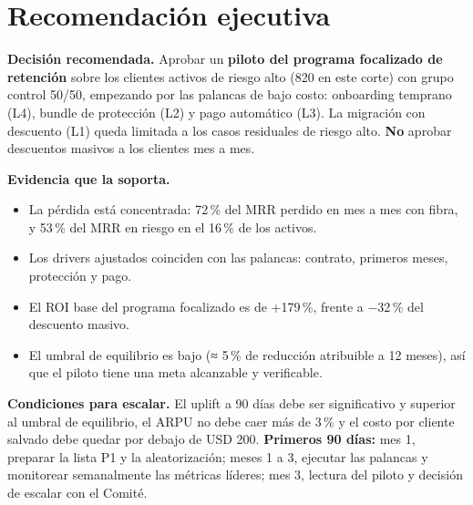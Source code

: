 \documentclass[10.5pt,a4paper]{article}
\begin{document}
\section{Recomendación ejecutiva}
\begin{caja}
\textbf{Decisión recomendada.} Aprobar un \textbf{piloto del programa focalizado de retención} sobre los clientes activos de riesgo alto (820 en este corte) con grupo control 50/50, empezando por las palancas de bajo costo: onboarding temprano (L4), bundle de protección (L2) y pago automático (L3). La migración con descuento (L1) queda limitada a los casos residuales de riesgo alto. \textbf{No} aprobar descuentos masivos a los clientes mes a mes.
\end{caja}
\textbf{Evidencia que la soporta.}
\begin{itemize}
  \item La pérdida está concentrada: 72\,\% del MRR perdido en mes a mes con fibra, y 53\,\% del MRR en riesgo en el 16\,\% de los activos.
  \item Los drivers ajustados coinciden con las palancas: contrato, primeros meses, protección y pago.
  \item El ROI base del programa focalizado es de +179\,\%, frente a −32\,\% del descuento masivo.
  \item El umbral de equilibrio es bajo (≈ 5\,\% de reducción atribuible a 12 meses), así que el piloto tiene una meta alcanzable y verificable.
\end{itemize}
\textbf{Condiciones para escalar.} El uplift a 90 días debe ser significativo y superior al umbral de equilibrio, el ARPU no debe caer más de 3\,\% y el costo por cliente salvado debe quedar por debajo de USD 200. \textbf{Primeros 90 días:} mes 1, preparar la lista P1 y la aleatorización; meses 1 a 3, ejecutar las palancas y monitorear semanalmente las métricas líderes; mes 3, lectura del piloto y decisión de escalar con el Comité.

\end{document}

